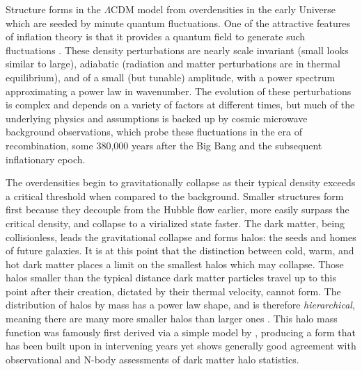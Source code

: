 Structure forms in the $\Lambda$CDM model from overdensities in the early Universe which are seeded by minute quantum fluctuations. One of the attractive features of inflation theory is that it provides a quantum field to generate such fluctuations \parencite{hawking82,guth82,starobinsky82}. These density perturbations are nearly scale invariant (small looks similar to large), adiabatic (radiation and matter perturbations are in thermal equilibrium), and of a small (but tunable) amplitude, with a power spectrum approximating a power law in wavenumber. The evolution of these perturbations is complex and depends on a variety of factors at different times, but much of the underlying physics and assumptions is backed up by cosmic microwave background observations, which probe these fluctuations in the era of recombination, some 380,000 years after the Big Bang and the subsequent inflationary epoch.

The overdensities begin to gravitationally collapse as their typical density exceeds a critical threshold when compared to the background. Smaller structures form first because they decouple from the Hubble flow earlier, more easily surpass the critical density, and collapse to a virialized state faster. The dark matter, being collisionless, leads the gravitational collapse and forms halos: the seeds and homes of future galaxies. It is at this point that the distinction between cold, warm, and hot dark matter places a limit on the smallest halos which may collapse. Those halos smaller than the typical distance dark matter particles travel up to this point after their creation, dictated by their thermal velocity, cannot form. The distribution of halos by mass has a power law shape, and is therefore \textit{hierarchical}, meaning there are many more smaller halos than larger ones \parencite{gao04,tinker08}. This halo mass function was famously first derived via a simple model by \textcite{press74}, producing a form that has been built upon in intervening years \parencite{bond91,sheth99,sheth01} yet shows generally good agreement with observational and N-body assessments of dark matter halo statistics.

